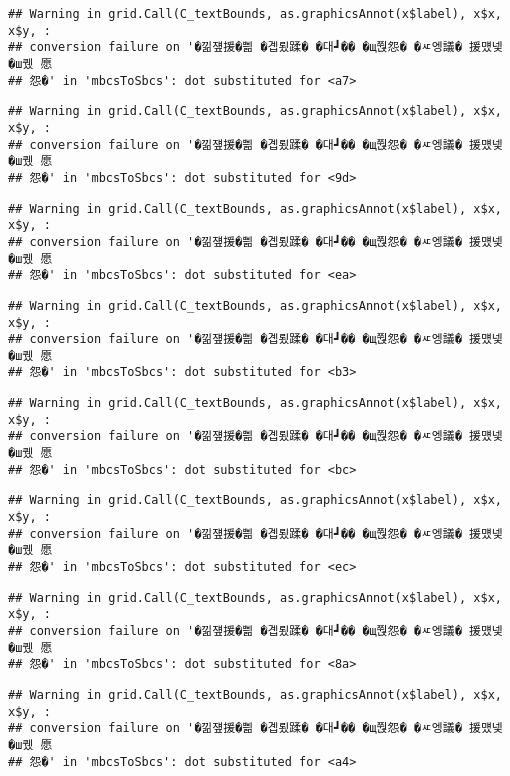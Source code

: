 \documentclass[
]{article}
\begin{document}
\begin{verbatim}
## Warning in grid.Call(C_textBounds, as.graphicsAnnot(x$label), x$x, x$y, :
## conversion failure on '�낆쟾援�쁾 �곕룄蹂� �대┛�� �щ쭩怨� �ㅼ엥議� 援먰넻�ш퀬 愿
## 怨�' in 'mbcsToSbcs': dot substituted for <a7>
\end{verbatim}

\begin{verbatim}
## Warning in grid.Call(C_textBounds, as.graphicsAnnot(x$label), x$x, x$y, :
## conversion failure on '�낆쟾援�쁾 �곕룄蹂� �대┛�� �щ쭩怨� �ㅼ엥議� 援먰넻�ш퀬 愿
## 怨�' in 'mbcsToSbcs': dot substituted for <9d>
\end{verbatim}

\begin{verbatim}
## Warning in grid.Call(C_textBounds, as.graphicsAnnot(x$label), x$x, x$y, :
## conversion failure on '�낆쟾援�쁾 �곕룄蹂� �대┛�� �щ쭩怨� �ㅼ엥議� 援먰넻�ш퀬 愿
## 怨�' in 'mbcsToSbcs': dot substituted for <ea>
\end{verbatim}

\begin{verbatim}
## Warning in grid.Call(C_textBounds, as.graphicsAnnot(x$label), x$x, x$y, :
## conversion failure on '�낆쟾援�쁾 �곕룄蹂� �대┛�� �щ쭩怨� �ㅼ엥議� 援먰넻�ш퀬 愿
## 怨�' in 'mbcsToSbcs': dot substituted for <b3>
\end{verbatim}

\begin{verbatim}
## Warning in grid.Call(C_textBounds, as.graphicsAnnot(x$label), x$x, x$y, :
## conversion failure on '�낆쟾援�쁾 �곕룄蹂� �대┛�� �щ쭩怨� �ㅼ엥議� 援먰넻�ш퀬 愿
## 怨�' in 'mbcsToSbcs': dot substituted for <bc>
\end{verbatim}

\begin{verbatim}
## Warning in grid.Call(C_textBounds, as.graphicsAnnot(x$label), x$x, x$y, :
## conversion failure on '�낆쟾援�쁾 �곕룄蹂� �대┛�� �щ쭩怨� �ㅼ엥議� 援먰넻�ш퀬 愿
## 怨�' in 'mbcsToSbcs': dot substituted for <ec>
\end{verbatim}

\begin{verbatim}
## Warning in grid.Call(C_textBounds, as.graphicsAnnot(x$label), x$x, x$y, :
## conversion failure on '�낆쟾援�쁾 �곕룄蹂� �대┛�� �щ쭩怨� �ㅼ엥議� 援먰넻�ш퀬 愿
## 怨�' in 'mbcsToSbcs': dot substituted for <8a>
\end{verbatim}

\begin{verbatim}
## Warning in grid.Call(C_textBounds, as.graphicsAnnot(x$label), x$x, x$y, :
## conversion failure on '�낆쟾援�쁾 �곕룄蹂� �대┛�� �щ쭩怨� �ㅼ엥議� 援먰넻�ш퀬 愿
## 怨�' in 'mbcsToSbcs': dot substituted for <a4>
\end{verbatim}
\end{document}
